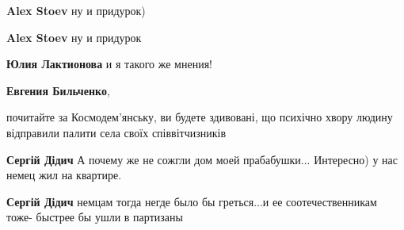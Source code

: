 \begin{itemize}
\begin{itemize}
 
\textbf{Alex Stoev} ну и придурок)

 
\textbf{Alex Stoev} ну и придурок

 
\textbf{Юлия Лактионова} и я такого же мнения!

 
\textbf{Евгения Бильченко}, 

почитайте за Космодем'янську, ви будете здивовані, що психічно хвору людину
відправили палити села своїх співвітчизників

 
\textbf{Сергій Дідич} А почему же не сожгли дом моей прабабушки... Интересно) у нас немец жил на квартире.

 
\textbf{Сергій Дідич} немцам тогда негде было бы греться...и ее соотечественникам тоже- быстрее бы ушли в партизаны

 

\end{itemize}
\end{itemize}
